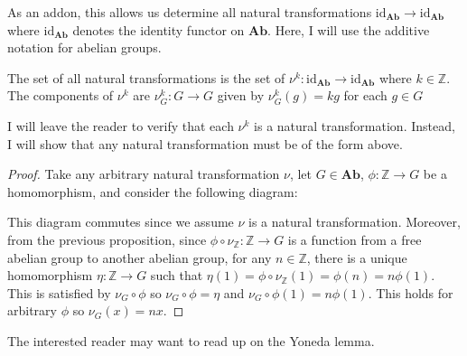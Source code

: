 \documentclass[12pt,reqno]{amsart}
\numberwithin{theorem}{section}
\theoremstyle{definition}
\theoremstyle{remark}
\numberwithin{equation}{section}
\newcommand{\Z}{\mathbb Z}
\theoremstyle{definition}
\begin{document}
\begin{example}
    As an addon, this allows us determine all natural transformations $\mathrm{id}_\mathbf{Ab}\rightarrow \mathrm{id}_\mathbf{Ab}$ where $\mathrm{id}_{\mathbf{Ab}}$ denotes the identity functor on $\mathbf{Ab}$. Here, I will use the additive notation for abelian groups.
    \begin{proposition}
        The set of all natural transformations is the set of $\nu^k : \mathrm{id}_\mathbf{Ab} \rightarrow \mathrm{id}_\mathbf{Ab}$ where $k \in \Z$. The components of $\nu^k$ are $\nu^k_G:G\rightarrow G$ given by $\nu^k_G(g) = kg$ for each $g\in G$
    \end{proposition}
    I will leave the reader to verify that each $\nu^k$ is a natural transformation. Instead, I will show that any natural transformation must be of the form above.
    \begin{proof}
        Take any arbitrary natural transformation $\nu$, let $G \in \mathbf{Ab}$, $\phi: \mathbb Z \rightarrow G$ be a homomorphism, and consider the following diagram:
    \begin{center}
\end{center}
This diagram commutes since we assume $\nu$ is a natural transformation. Moreover, from the previous proposition, since $\phi\circ  \nu_\Z: \mathbb Z \rightarrow G $ is a function from a free abelian group to another abelian group, for any $n \in \Z$, there is a unique homomorphism $\eta : \mathbb Z \rightarrow G$ such that $\eta(1) = \phi\circ  \nu_\Z(1) = \phi(n) =n \phi(1)$. This is satisfied by $\nu_G \circ \phi$ so $\nu_G \circ \phi = \eta$ and $\nu_G \circ \phi(1) = n \phi(1)$. This holds for arbitrary $\phi$ so $\nu_G (x) = nx$.
    \end{proof}
    The interested reader may want to read up on the Yoneda lemma. 
\end{example}
\end{document}
